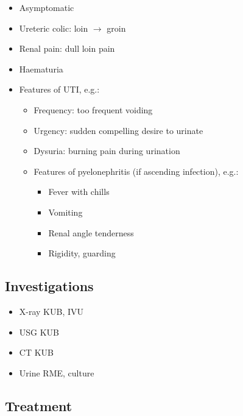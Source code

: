 \documentclass[
  12pt,
]{memoir}
\providecommand{\tightlist}{%
  \setlength{\itemsep}{0pt}\setlength{\parskip}{0pt}}
\begin{document}
\begin{itemize}
\tightlist
\item
  Asymptomatic
\item
  Ureteric colic: loin \(\rightarrow\) groin
\item
  Renal pain: dull loin pain
\item
  Haematuria
\item
  Features of UTI, e.g.:

  \begin{itemize}
  \tightlist
  \item
    Frequency: too frequent voiding
  \item
    Urgency: sudden compelling desire to urinate
  \item
    Dysuria: burning pain during urination
  \item
    Features of pyelonephritis (if ascending infection), e.g.:

    \begin{itemize}
    \tightlist
    \item
      Fever with chills
    \item
      Vomiting
    \item
      Renal angle tenderness
    \item
      Rigidity, guarding
    \end{itemize}
  \end{itemize}
\end{itemize}

\hypertarget{investigations-4}{%
\subsection{Investigations}\label{investigations-4}}

\begin{itemize}
\tightlist
\item
  X-ray KUB, IVU
\item
  USG KUB
\item
  CT KUB
\item
  Urine RME, culture
\end{itemize}

\hypertarget{treatment-4}{%
\subsection{Treatment}\label{treatment-4}}
\end{document}
